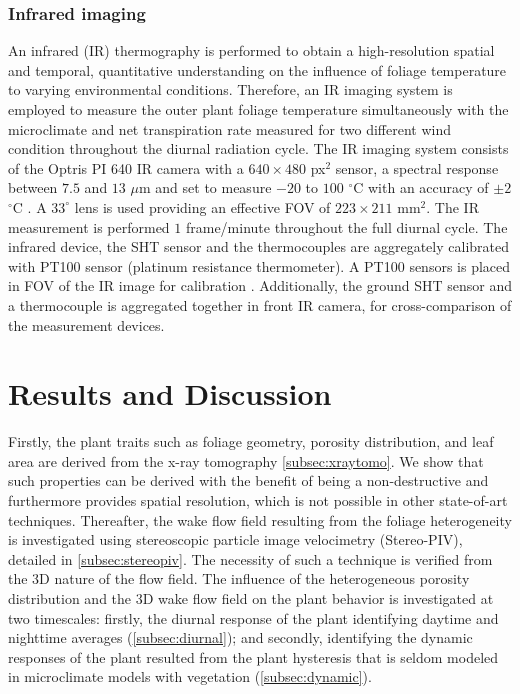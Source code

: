 \subsubsection*{Infrared imaging}
An infrared (IR) thermography is performed to obtain a high-resolution spatial and temporal, quantitative understanding on the influence of foliage temperature to varying environmental conditions. Therefore, an IR imaging system is employed to measure the outer plant foliage temperature simultaneously with the microclimate and net transpiration rate measured for two different wind condition throughout the diurnal radiation cycle. The IR imaging system consists of the Optris PI 640 IR camera with a $640\times480$ px$^2$ sensor, a spectral response between $7.5$ and $13$ $\mu$m and set to measure $-20$ to $100$ $^{\circ}$C with an accuracy of $\pm2$ $^{\circ}$C \citep{Allegrini2018,Tsalicoglou2018}. A $33^{\circ}$ lens is used providing an effective FOV of $223\times211$ mm$^2$. The IR measurement is performed $1$ frame/minute throughout the full diurnal cycle. The infrared device, the SHT sensor and the thermocouples are aggregately calibrated with PT100 sensor (platinum resistance thermometer). A PT100 sensors is placed in FOV of the IR image for calibration \citep{Allegrini2018}. Additionally, the ground SHT sensor and a thermocouple is aggregated together in front IR camera, for cross-comparison of the measurement devices.


\section{Results and Discussion}

Firstly, the plant traits such as foliage geometry, porosity distribution, and leaf area are derived from the x-ray tomography \cref{subsec:xraytomo}. We show that such properties can be derived with the benefit of being a non-destructive and furthermore provides spatial resolution, which is not possible in other state-of-art techniques. Thereafter, the wake flow field resulting from the foliage heterogeneity is investigated using stereoscopic particle image velocimetry (Stereo-PIV), detailed in \cref{subsec:stereopiv}. The necessity of such a technique is verified from the 3D nature of the flow field. The influence of the heterogeneous porosity distribution and the 3D wake flow field on the plant behavior is investigated at two timescales: firstly, the diurnal response of the plant identifying daytime and nighttime averages (\cref{subsec:diurnal}); and secondly, identifying the dynamic responses of the plant resulted from the plant hysteresis that is seldom modeled in microclimate models with vegetation (\cref{subsec:dynamic}). 

